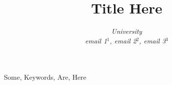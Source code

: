 \documentclass[conference]{IEEEtran}
\begin{document}
\title{Title Here}

\author{
\textit{University}\\
\textit{email 1$^{1}$, email 2$^{2}$, email 3$^{3}$}}

  \maketitle

  \begin{IEEEkeywords}
    Some, Keywords, Are, Here

  \end{IEEEkeywords}

  
  
\end{document}
